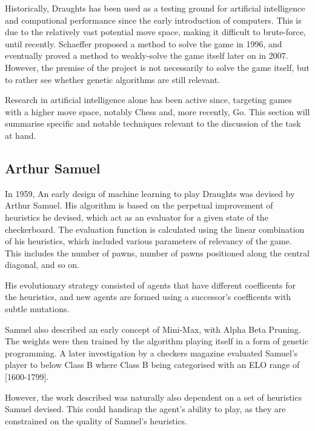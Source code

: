 \documentclass[12pt,a4paper]{article}
\begin{document}
    Historically, Draughts has been used as a testing ground for artificial intelligence and computional performance since the early introduction of computers. This is due to the relatively vast potential move space, making it difficult to brute-force, until recently. Schaeffer proposed a method to solve the game in 1996\cite{schaeffer_solving_1996}, and eventually proved a method to weakly-solve the game itself later on in 2007\cite{schaeffer_checkers_2007}. However, the premise of the project is not necessarily to solve the game itself, but to rather see whether genetic algorithms are still relevant.

    Research in artificial intelligence alone has been active since, targeting games with a higher move space, notably Chess and, more recently, Go. This section will summarise specific and notable techniques relevant to the discussion of the task at hand.

    \subsection{Arthur Samuel}
        In 1959, An early design of machine learning to play Draughts was devised by Arthur Samuel\cite{samuel_studies_1959}. His algorithm is based on the perpetual improvement of heuristics he devised, which act as an evaluator for a given state of the checkerboard. The evaluation function is calculated using the linear combination of his heuristics, which included various parameters of relevancy of the game. This includes the number of pawns, number of pawns positioned along the central diagonal, and so on. 

        His evolutionary strategy consisted of agents that have different coefficents for the heuristics, and new agents are formed using a successor's coefficents with subtle mutations.

        Samuel also described an early concept of Mini-Max, with Alpha Beta Pruning. The weights were then trained by the algorithm playing itself in a form of genetic programming. A later investigation by a checkers magazine evaluated Samuel's player to below Class B \cite{schaeffer_one_1997,fogel_evolving_2000} where Class B being categorised with an ELO range of [1600-1799]. 

        However, the work described was naturally also dependent on a set of heuristics Samuel devised. This could handicap the agent's ability to play, as they are constrained on the quality of Samuel's heuristics. 
\end{document}

